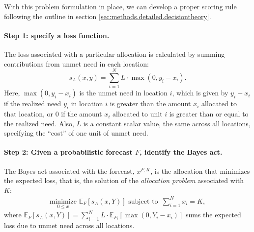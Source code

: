 \documentclass{article}\usepackage[]{graphicx}\usepackage[]{xcolor}
\begin{document}
With this problem formulation in place, we can develop a proper scoring rule following the outline in section \ref{sec:methods.detailed.decisiontheory}.

\paragraph{Step 1: specify a loss function.} The loss associated with a particular allocation is calculated by summing contributions from unmet need in each location:
\begin{equation}
s_A(x, y) = \sum_{i=1}^N L \cdot \max(0, y_i - x_i). \label{eqn:loss_fn}
\end{equation}
Here, $\max(0, y_i - x_i)$ is the unmet need in location $i$, which is given by $y_i - x_i$ if the realized need $y_i$ in location $i$ is greater than the amount $x_i$ allocated to that location, or $0$ if the amount $x_i$ allocated to unit $i$ is greater than or equal to the realized need. Also, $L$ is a constant scalar value, the same across all locations, specifying the ``cost'' of one unit of unmet need.

\paragraph{Step 2: Given a probabilistic forecast $F$, identify the Bayes act.} The Bayes act associated with the forecast, $x^{F,K}$, is the allocation that minimizes the expected loss, that is, the solution of the \emph{allocation problem} associated with $K$:
\begin{align}
    \underset{0 \leq x}{\mathrm{minimize}}\,\, \mathbb{E}_{F} [s_A(x, Y)] \text{ subject to }
     \, \sum_{i=1}^N x_i = K, \label{AP}
\end{align}
where $\mathbb{E}_{F} [s_A(x, Y)] = \sum_{i=1}^{N} L \cdot \mathbb{E}_{F_i}[\max(0, Y_i - x_i)]$ sums the expected loss due to unmet need across all locations.
\end{document}
